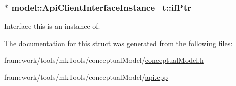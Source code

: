 \subsubsection[{\texorpdfstring{if\+Ptr}{ifPtr}}]{$\ast$ model\+::\+Api\+Client\+Interface\+Instance\+\_\+t\+::if\+Ptr}\hypertarget{structmodel_1_1_api_client_interface_instance__t_a1c1984996de0ea8379654c32c4717bc7}{}\label{structmodel_1_1_api_client_interface_instance__t_a1c1984996de0ea8379654c32c4717bc7}


Interface this is an instance of. 



The documentation for this struct was generated from the following files\+:\begin{DoxyCompactItemize}
\item 
framework/tools/mk\+Tools/conceptual\+Model/\hyperlink{conceptual_model_8h}{conceptual\+Model.\+h}\item 
framework/tools/mk\+Tools/conceptual\+Model/\hyperlink{api_8cpp}{api.\+cpp}\end{DoxyCompactItemize}
